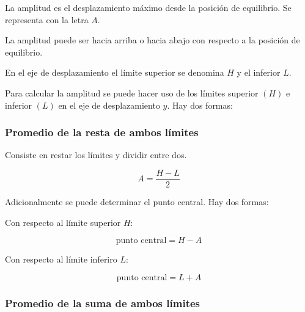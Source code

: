 La amplitud es el desplazamiento máximo desde la posición de equilibrio. Se representa con la letra $A$.

La amplitud puede ser hacia arriba o hacia abajo con respecto a la posición de equilibrio.

En el eje de desplazamiento el límite superior se denomina $H$ y el inferior $L$.


Para calcular la amplitud se puede hacer uso de los límites superior $(H)$ e inferior $(L)$ en el eje de desplazamiento $y$. Hay dos formas:

\subsubsection{Promedio de la resta de ambos límites}

Consiste en restar los límites y dividir entre dos.

\[
  A=\dfrac{H-L}{2}
\]

Adicionalmente se puede determinar el punto central. Hay dos formas:

Con respecto al límite superior $H$:

\[
  \text{punto central}=H-A
\]

Con respecto al límite inferiro $L$:

\[
  \text{punto central}=L+A
\]

\subsubsection{Promedio de la suma de ambos límites}

